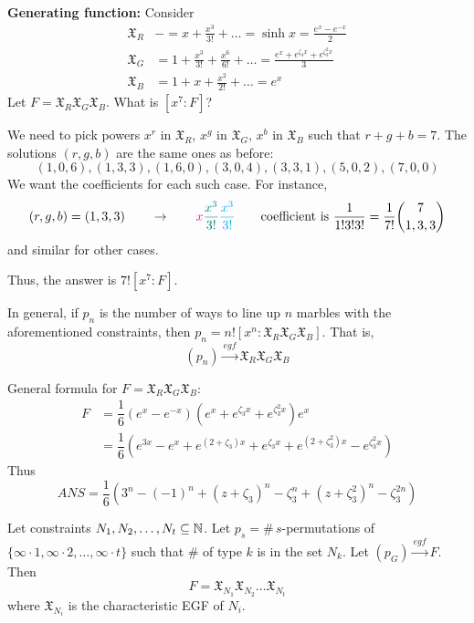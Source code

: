 \documentclass[12pt]{article}
\begin{document}
\textbf{Generating function:} Consider \begin{align*}
    \mathfrak{X}_R &-=x+\frac{x^3}{3!}+\dots = \sinh x=\frac{e^x-e^{-x}}{2}\\
    \mathfrak{X}_G &= 1+\frac{x^3}{3!}+\frac{x^6}{6!}+\dots = \frac{e^x+e^{\zeta_3x}+e^{\zeta_3^2x}}{3}\\
    \mathfrak{X}_B &= 1+x+\frac{x^2}{2!}+\dots = e^x
\end{align*}
Let $F=\mathfrak{X}_R\mathfrak{X}_G \mathfrak{X}_B$. What is $[x^7:F]$?

We need to pick powers $x^r$ in $\mathfrak{X}_R$, $x^g$ in $\mathfrak{X}_G$, $x^b$ in $\mathfrak{X}_B$ such that $r+g+b=7$. The solutions $(r,g,b)$ are the same ones as before: \[(1,0,6), (1,3,3),(1,6,0),(3,0,4),(3,3,1),(5,0,2),(7,0,0)\]
We want the coefficients for each such case. For instance, \[(r,g,b)=(1,3,3) \qquad \to \qquad \textcolor{magenta}{x}\textcolor{teal}{\frac{x^3}{3!}}\textcolor{cyan}{\frac{x^3}{3!}}\qquad \text{coefficient is } \frac{1}{1!3!3!} = \frac{1}{7!}{7\choose 1,3,3}\] and similar for other cases.

Thus, the answer is $7![x^7:F]$.

In general, if $p_n$ is the number of ways to line up $n$ marbles with the aforementioned constraints, then $p_n = n![x^n :\mathfrak{X}_R\mathfrak{X}_G \mathfrak{X}_B]$. That is, \[(p_n)\xrightarrow{egf}\mathfrak{X}_R\mathfrak{X}_G \mathfrak{X}_B\]

General formula for $F = \mathfrak{X}_R\mathfrak{X}_G \mathfrak{X}_B$:
\begin{align*}
    F&=\dfrac{1}{6}\left( e^{x}-e^{-x}\right) \left( e^{x}+e^{\zeta _{3}x}+e^{\zeta _{3}^{2}x}\right) e^{x}\\
    &= \dfrac{1}{6}\left( e^{3x}-e^{x}+e^{\left( 2+\zeta_3\right) x}+e^{\zeta_3x}+e^{\left( 2+\zeta_3^{2}\right) x}-e^{\zeta_3^{2}x}\right)
\end{align*}
Thus \[ANS = \dfrac{1}{6}\left( 3^{n}-\left( -1\right) ^{n}+\left( z+\zeta_3\right) ^{n}-\zeta_3^{n}+\left( z+\zeta_3 ^{2}\right) ^{n}-\zeta_3^{2n}\right)\]

\begin{theorem}
    Let constraints $N_1,N_2,\dots,N_t\subseteq \mathbb{N}$. Let $p_s=\#\, s$-permutations of $\{\infty\cdot 1, \infty\cdot 2,\dots ,\infty\cdot t\}$ such that \# of type $k$ is in the set $N_k$.
    Let $(p_G)\xrightarrow{egf}F$. Then \[F=\mathfrak{X}_{N_1}\mathfrak{X}_{N_2}\dots \mathfrak{X}_{N_t}\]
    where $\mathfrak{X}_{N_i}$ is the characteristic EGF of $N_i$.
\end{theorem}
\end{document}
